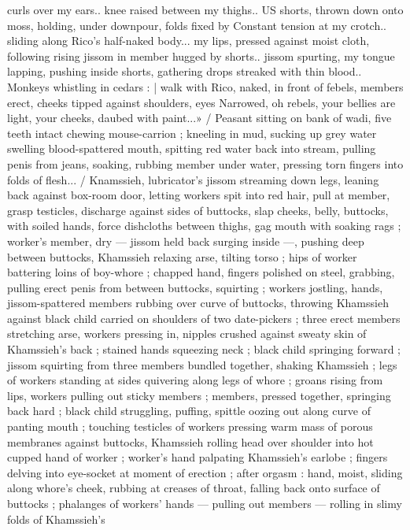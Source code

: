 curls over my ears.. knee raised between my thighs.. US shorts,
thrown down onto moss, holding, under downpour, folds fixed by
Constant tension at my crotch.. sliding along Rico's half-naked body...
my lips, pressed against moist cloth, following rising jissom in
member hugged by shorts.. jissom spurting, my tongue lapping,
pushing inside shorts, gathering drops streaked with thin blood..
Monkeys whistling in cedars : | walk with Rico, naked, in front of
febels, members erect, cheeks tipped against shoulders, eyes
Narrowed, oh rebels, your bellies are light, your cheeks, daubed with
paint...» / Peasant sitting on bank of wadi, five teeth intact chewing
mouse-carrion ; kneeling in mud, sucking up grey water swelling
blood-spattered mouth, spitting red water back into stream, pulling
penis from jeans, soaking, rubbing member under water, pressing
torn fingers into folds of flesh... / Knamssieh, lubricator's jissom
streaming down legs, leaning back against box-room door, letting
workers spit into red hair, pull at member, grasp testicles, discharge
against sides of buttocks, slap cheeks, belly, buttocks, with soiled
hands, force dishcloths between thighs, gag mouth with soaking rags
; worker's member, dry --- jissom held back surging inside ---,
pushing deep between buttocks, Khamssieh relaxing arse, tilting
torso ; hips of worker battering loins of boy-whore ; chapped hand,
fingers polished on steel, grabbing, pulling erect penis from between
buttocks, squirting ; workers jostling, hands, jissom-spattered
members rubbing over curve of buttocks, throwing Khamssieh
against black child carried on shoulders of two date-pickers ; three
erect members stretching arse, workers pressing in, nipples crushed
against sweaty skin of Khamssieh’s back ; stained hands squeezing
neck ; black child springing forward ; jissom squirting from three
members bundled together, shaking Khamssieh ; legs of workers
standing at sides quivering along legs of whore ; groans rising from
lips, workers pulling out sticky members ; members, pressed
together, springing back hard ; black child struggling, puffing, spittle
oozing out along curve of panting mouth ; touching testicles of
workers pressing warm mass of porous membranes against buttocks,
Khamssieh rolling head over shoulder into hot cupped hand of
worker ; worker's hand palpating Khamssieh's earlobe ; fingers
delving into eye-socket at moment of erection ; after orgasm : hand,
moist, sliding along whore's cheek, rubbing at creases of throat,
falling back onto surface of buttocks ; phalanges of workers’ hands
--- pulling out members --- rolling in slimy folds of Khamssieh's
